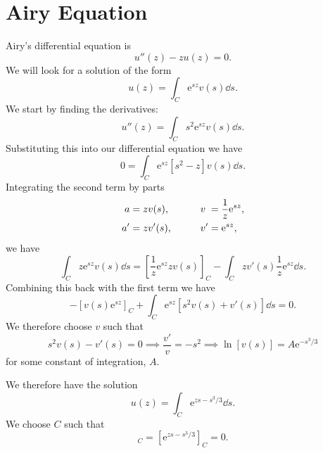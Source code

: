 \documentclass[fleqn]{NotesClass}
\newcommand*{\e}{\mathrm{e}}
\begin{document}
    \section{Airy Equation}
    Airy's differential equation is
    \begin{equation}
        u''(z) - zu(z) = 0.
    \end{equation}
    We will look for a solution of the form
    \begin{equation}
        u(z) = \int_C \e^{sz}v(s)\dd{s}.
    \end{equation}
    We start by finding the derivatives:
    \begin{equation}
        u''(z) = \int_C s^2\e^{sz}v(s) \dd{s}.
    \end{equation}
    Substituting this into our differential equation we have
    \begin{equation}
        0 = \int_C \e^{sz}[s^2 - z]v(s) \dd{s}.
    \end{equation}
    Integrating the second term by parts
    \begin{alignat}{2}
        a &= zv(s), \qquad & v\hphantom{'} &= \frac{1}{z}\e^{sz},\\
        a' &= zv'(s), \qquad & v' &= \e^{sz},
    \end{alignat}
    we have
    \begin{equation}
        \int_{C} z\e^{sz}v(s) \dd{s} = \left[ \frac{1}{z}\e^{sz}zv(s) \right]_C - \int_C zv'(s)\frac{1}{z}\e^{sz} \dd{s}.
    \end{equation}
    Combining this back with the first term we have
    \begin{equation}
        -[v(s)\e^{sz}]_C + \int_C \e^{sz}[s^2v(s) + v'(s)]\dd{s} = 0.
    \end{equation}
    We therefore choose \(v\) such that
    \begin{equation}
        s^2v(s) - v'(s) = 0 \implies \frac{v'}{v} = -s^2 \implies \ln [v(s)] = A\e^{-s^3/3}
    \end{equation}
    for some constant of integration, \(A\).
    
    We therefore have the solution
    \begin{equation}
        u(z) = \int_C \e^{zs - s^3/3} \dd{s}.
    \end{equation}
    We choose \(C\) such that
    \begin{equation}
        [v(s)\e^{sz}]_C = [\e^{zs - s^3/3}]_C = 0.
    \end{equation}
    
\end{document}

